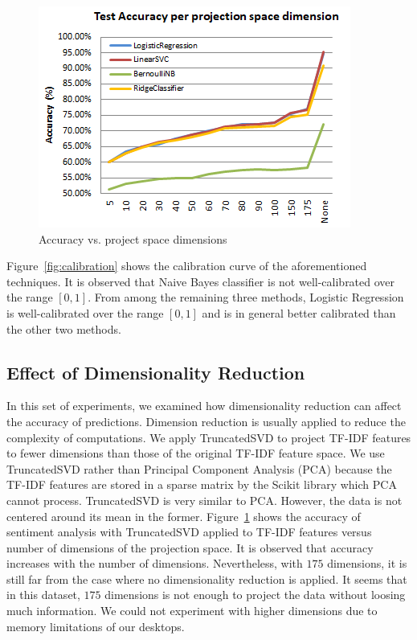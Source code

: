 \begin{figure}[tbh]%
\centering
\includegraphics[width=0.9\columnwidth]{figures/dim_reduction_accuracy.png}%
\caption{Accuracy vs. project space dimensions}%
\label{fig:dim-reduction}%
\end{figure}
Figure~\ref{fig:calibration} shows the calibration curve of the aforementioned techniques. It is observed that Naive Bayes classifier is not well-calibrated over the range $[0,1]$. From among the remaining three methods, Logistic Regression is well-calibrated over the range $[0,1]$ and is in general better calibrated than the other two methods.


\subsection{Effect of Dimensionality Reduction}
\label{sec:dim-reduction}
In this set of experiments, we examined how dimensionality reduction can affect the accuracy of predictions. Dimension reduction is usually applied to reduce the complexity of computations. We apply TruncatedSVD to project TF-IDF features to fewer dimensions than those of the original TF-IDF feature space. We use TruncatedSVD rather than Principal Component Analysis (PCA) because the TF-IDF features are stored in a sparse matrix by the Scikit library which PCA cannot process. TruncatedSVD is very similar to PCA. However, the data is not centered around its mean in the former.
Figure~\ref{fig:dim-reduction} shows the accuracy of sentiment analysis with TruncatedSVD applied to TF-IDF features versus number of dimensions of the projection space. It is observed that accuracy increases with the number of dimensions. Nevertheless, with $175$ dimensions, it is still far from the case where no dimensionality reduction is applied. It seems that in this dataset, $175$ dimensions is not enough to project the data without loosing much information. We could not experiment with higher dimensions due to memory limitations of our desktops.

